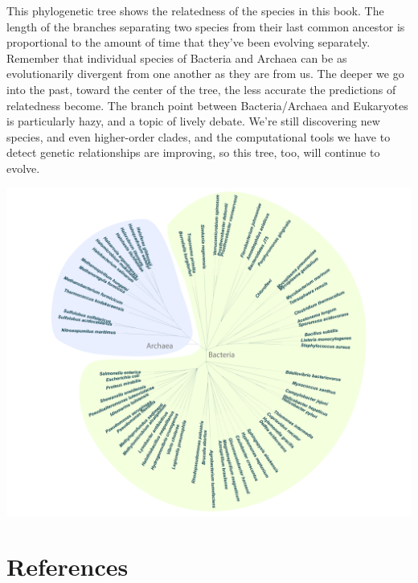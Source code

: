 \documentclass[]{tufte-book}
\begin{document}
This phylogenetic tree shows the relatedness of the species in this book. The length of the branches separating two species from their last common ancestor is proportional to the amount of time that they've been evolving separately. Remember that individual species of Bacteria and Archaea can be as evolutionarily divergent from one another as they are from us. The deeper we go into the past, toward the center of the tree, the less accurate the predictions of relatedness become. The branch point between Bacteria/Archaea and Eukaryotes is particularly hazy, and a topic of lively debate. We're still discovering new species, and even higher-order clades, and the computational tools we have to detect genetic relationships are improving, so this tree, too, will continue to evolve.

\includegraphics[width=23.06in]{img/Tree}

\hypertarget{references}{%
\chapter{References}\label{references}}


\end{document}
